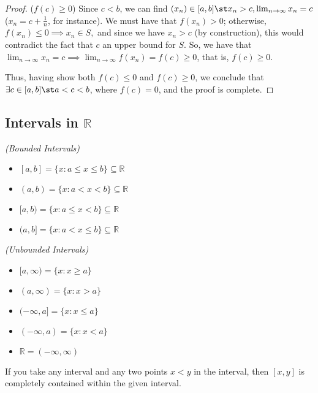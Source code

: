 \documentclass[12pt]{article}
\begin{document}
\begin{proof}
  \noindent($f(c) \geq 0$) Since $c < b$, we can find $(x_n) \in [a, b] \st x_n > c, \lim_{n\to\infty} x_n = c$ ($x_n = c + \frac{1}{n}$, for instance). We must have that $f(x_n) > 0$; otherwise, $f(x_n) \leq 0 \implies x_n \in S,$ and since we have $x_n > c$ (by construction), this would contradict the fact that $c$ an upper bound for $S$. So, we have that $\lim_{n\to\infty} x_n = c \implies \lim_{n\to\infty} f(x_n) = f(c) \geq 0$, that is, $f(c) \geq 0$.

  Thus, having show both $f(c) \leq 0$ and $f(c) \geq 0$, we conclude that $\exists c \in [a, b] \st a < c < b$, where $f(c) = 0$, and the proof is complete.
\end{proof}

\subsection{\texorpdfstring{Intervals in $\mathbb{R}$}{Intervals in the Reals}}

\begin{definition}
  \emph{(Bounded Intervals)}
  \begin{itemize}
    \item $[a, b] = \{x : a \leq x \leq b\} \subseteq \mathbb{R}$
    \item $(a, b) = \{x : a < x < b\} \subseteq \mathbb{R}$
    \item $[a, b) = \{x : a \leq x < b\} \subseteq \mathbb{R}$
    \item $(a, b] = \{x : a < x \leq b\} \subseteq \mathbb{R}$
  \end{itemize}
  \emph{(Unbounded Intervals)}
  \begin{itemize}
    \item $[a, \infty) = \{x : x \geq a\}$
    \item $(a, \infty) = \{x : x > a\}$
    \item $(-\infty, a] = \{ x : x \leq a\}$
    \item $(-\infty, a) = \{ x : x < a\}$
  \end{itemize}
  \begin{itemize}
    \item $\mathbb{R} = (- \infty, \infty)$
  \end{itemize}
\end{definition}

\begin{remark}
  If you take any interval and any two points $x < y$ in the interval, then $[x, y]$ is completely contained within the given interval. 
\end{remark}
\end{document}
